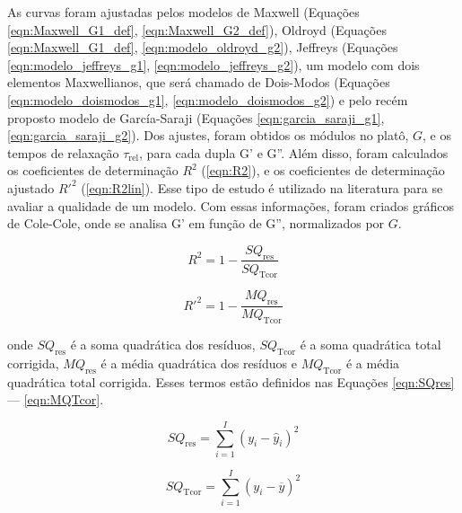 		As curvas foram ajustadas pelos modelos de Maxwell (Equações \ref{eqn:Maxwell_G1_def}, \ref{eqn:Maxwell_G2_def}), Oldroyd (Equações \ref{eqn:Maxwell_G1_def}, \ref{eqn:modelo_oldroyd_g2}), Jeffreys (Equações \ref{eqn:modelo_jeffreys_g1}, \ref{eqn:modelo_jeffreys_g2}), um modelo com dois elementos Maxwellianos, que será chamado de Dois-Modos (Equações \ref{eqn:modelo_doismodos_g1}, \ref{eqn:modelo_doismodos_g2}) e pelo recém proposto modelo de García-Saraji (Equações \ref{eqn:garcia_saraji_g1}, \ref{eqn:garcia_saraji_g2}). Dos ajustes, foram obtidos os módulos no platô, \(G\), e os tempos de relaxação \(\tau_\mathrm{rel}\), para cada dupla G' e G''. Além disso, foram calculados os coeficientes de determinação \(R^2\) (\autoref{eqn:R2}), e os coeficientes de determinação ajustado \(R\mathrm{'}^{2}\) (\autoref{eqn:R2lin}).\cite{MarciaQuimiometria} Esse tipo de estudo é utilizado na literatura para se avaliar a qualidade de um modelo.\cite{Garcia2018} Com essas informações, foram criados gráficos de Cole-Cole, onde se analisa G' em função de G'', normalizados por \(G\).
		
		\begin{equation}
			R^2 = 1 - \dfrac{SQ_\mathrm{res}}{SQ_\mathrm{Tcor}}
			\label{eqn:R2}
		\end{equation} 
		
		\begin{equation}
			R\mathrm{'}^{2} = 1 - \dfrac{MQ_\mathrm{res}}{MQ_\mathrm{Tcor}}
			\label{eqn:R2lin}
		\end{equation} 
		
		\noindent onde \(SQ_\mathrm{res}\) é a soma quadrática dos resíduos, \(SQ_\mathrm{Tcor}\) é a soma quadrática total corrigida, \(MQ_\mathrm{res}\) é a média quadrática dos resíduos e \(MQ_\mathrm{Tcor}\) é a média quadrática total corrigida. Esses termos estão definidos nas Equações \ref{eqn:SQres} --- \ref{eqn:MQTcor}.\cite{MarciaQuimiometria}
		
		\begin{equation}
			SQ_\mathrm{res} = \sum_{i=1}^{I} \left( y_i - \hat{y}_i \right) ^ 2
			\label{eqn:SQres}
		\end{equation}
		
		\begin{equation}
			SQ_\mathrm{Tcor} = \sum_{i=1}^{I} \left(y_i - \overline{y} \right)^2
			\label{eqn:SQTcor}
		\end{equation}
		
